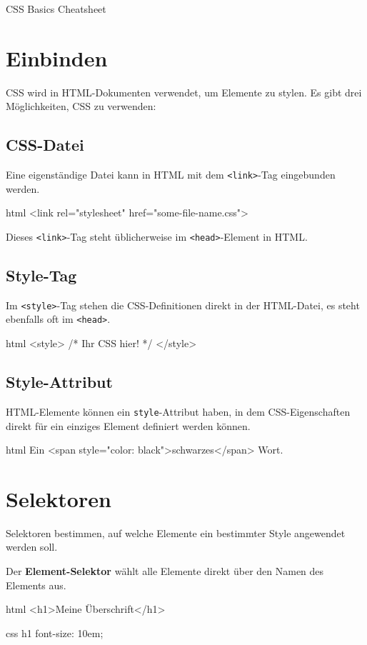 \documentclass[10pt,a4paper]{article}
\begin{document}
{\color{accentcolor}CSS Basics Cheatsheet}

\begin{multicols}{3}

\scriptsize

\section*{Einbinden}
CSS wird in HTML-Dokumenten verwendet, um Elemente zu stylen. Es gibt drei Möglichkeiten, CSS zu verwenden:

\subsection*{CSS-Datei}
Eine eigenständige Datei kann in HTML mit dem \texttt{<link>}-Tag eingebunden werden.
\begin{codebox}{html}{}
<link rel="stylesheet" href="some-file-name.css">
\end{codebox}
Dieses \texttt{<link>}-Tag steht üblicherweise im \texttt{<head>}-Element in HTML.

\subsection*{Style-Tag}
Im \texttt{<style>}-Tag stehen die CSS-Definitionen direkt in der HTML-Datei, es steht ebenfalls oft im \texttt{<head>}.
\begin{codebox}{html}{}
<style>
/* Ihr CSS hier! */
</style>
\end{codebox}

\subsection*{Style-Attribut}
HTML-Elemente können ein \texttt{style}-Attribut haben, in dem CSS-Eigenschaften direkt für ein einziges Element definiert werden können.
\begin{codebox}{html}{}
Ein <span style="color: black">schwarzes</span> Wort.
\end{codebox}

\section*{Selektoren}
Selektoren bestimmen, auf welche Elemente ein bestimmter Style angewendet werden soll.
\vspace{0.2cm}

Der \textbf{Element-Selektor} wählt alle Elemente direkt über den Namen des Elements aus.
\begin{codebox}{html}{}
<h1>Meine Überschrift</h1>
\end{codebox}
\begin{codebox}{css}{}
h1 {
  font-size: 10em;
}
\end{codebox}


\end{multicols}
\end{document}
